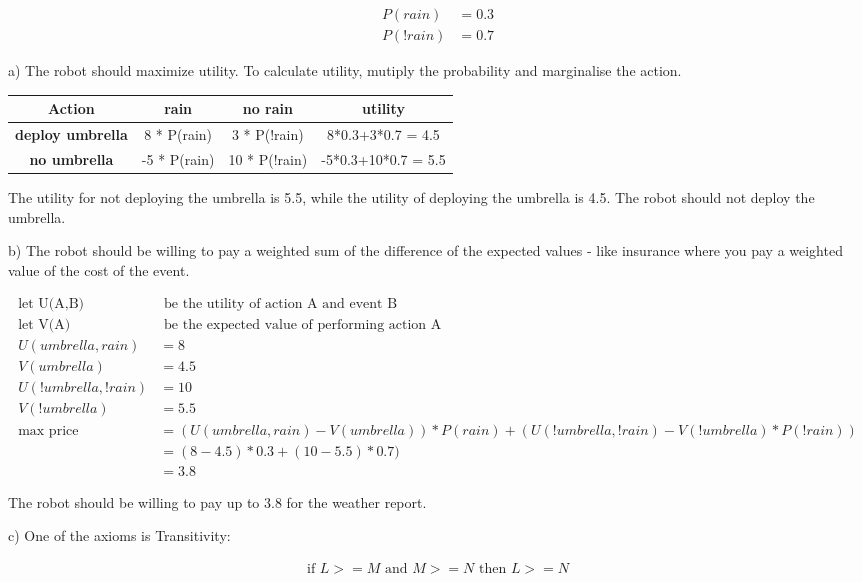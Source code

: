 \documentclass[11pt]{article}
\begin{document}
\begin{align*}
P(rain)	&= 0.3\\
P(!rain) &= 0.7
\end{align*}

a) The robot should maximize utility. To calculate utility, mutiply the probability and marginalise the action.

\begin{center}
	\begin{tabular}{|c | c | c | c |}
		\hline
		\textbf{Action} & \textbf{rain} &  \textbf{no rain} & \textbf{utility}\\
		\hline
		\textbf{deploy umbrella} & 8 * P(rain) & 3 * P(!rain) & 8*0.3+3*0.7 = 4.5\\
		\textbf{no umbrella} & -5 * P(rain)  & 10 * P(!rain) & -5*0.3+10*0.7 = 5.5 \\
		\hline		 
	\end{tabular}
\end{center}

The utility for not deploying the umbrella is 5.5, while the utility of deploying the umbrella is 4.5. The robot should not deploy the umbrella.

b) The robot should be willing to pay a weighted sum of the difference of the expected values - like insurance where you pay a weighted value of the cost of the event.

\begin{align*}
	\text{let U(A,B)} & \text{ be the utility of action A and event B} \\
	\text{let V(A)} & \text{ be the expected value of performing action A} \\
	U(umbrella, rain) &= 8 \\
	V(umbrella) &= 4.5 \\
	U(!umbrella, !rain) &= 10 \\
	V(!umbrella) &= 5.5 \\
	\text{max price} &= (U(umbrella, rain) - V(umbrella))*P(rain) + (U(!umbrella, !rain) - V(!umbrella) * P(!rain)) \\
	&= (8 - 4.5)*0.3 + (10-5.5)*0.7)\\
	&= 3.8
\end{align*}

The robot should be willing to pay up to 3.8 for the weather report.

c) One of the axioms is Transitivity:

\begin{align*}
	\text{if } L >= M \text{ and } M >= N \text{ then } L >= N \\
\end{align*}
\end{document}
